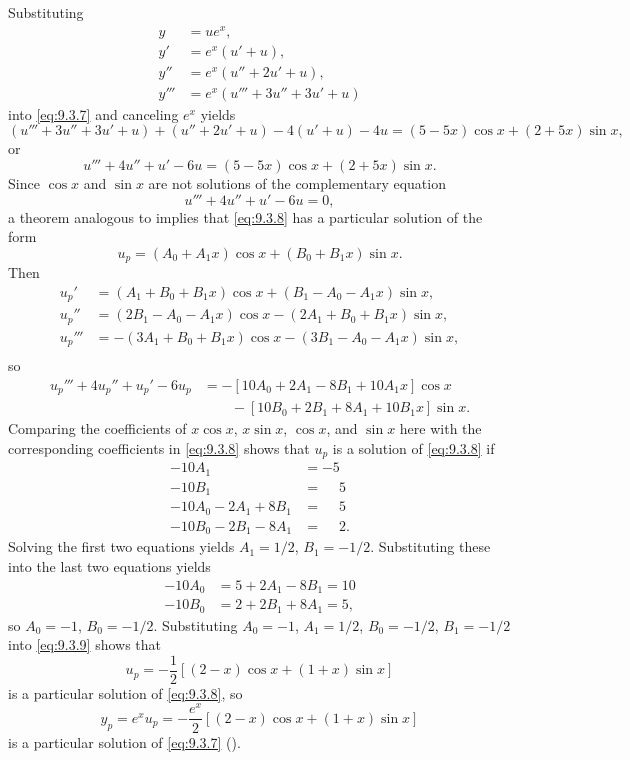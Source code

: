 \begin{solution}
Substituting
\begin{align*}
y&=ue^x,\\
y'&=e^x(u'+u),\\
y''&=e^x(u''+2u'+u),\\
y'''&=e^x(u'''+3u''+3u'+u)
\end{align*}
into \eqref{eq:9.3.7} and canceling $e^x$ yields
\[
(u'''+3u''+3u'+u)+(u''+2u'+u)-4(u'+u)-4u
=(5-5x)\cos x+(2+5x)\sin x,
\]
or
\begin{equation} \label{eq:9.3.8}
u'''+4u''+u'-6u=(5-5x)\cos x+(2+5x)\sin x.
\end{equation}
Since $\cos x$ and $\sin x$ are not solutions of the complementary
equation
\[
u'''+4u''+u'-6u=0,
\]
a theorem analogous to  implies that
\eqref{eq:9.3.8} has a particular solution of the form
\begin{equation} \label{eq:9.3.9}
u_p=(A_0+A_1x)\cos x+(B_0+B_1x)\sin x.
\end{equation}
Then
\begin{align*}
u_p'&=(A_1+B_0+B_1x)\cos x+(B_1-A_0-A_1x)\sin x,\\
u_p''&=(2B_1-A_0-A_1x)\cos x-(2A_1+B_0+B_1x)\sin x,\\
u_p'''&=-(3A_1+B_0+B_1x)\cos x-(3B_1-A_0-A_1x)\sin x,\\
\end{align*}
so
\begin{align*}
u_p'''+4u_p''+u_p'-6u_p
&=-\left[10A_0+2A_1-8B_1+10A_1x\right]\cos x\\
&\qquad{}- \left[10B_0+2B_1+8A_1+10B_1x\right]\sin x.
\end{align*}
Comparing the coefficients of $x\cos x$, $x\sin x$, $\cos x$, and
$\sin x$ here with the corresponding coefficients in \eqref{eq:9.3.8}
shows that $u_p$ is a solution of \eqref{eq:9.3.8} if
\begin{align*}
-10A_1&=-5\\
-10B_1&=\phantom{-}5\\
-10A_0-2A_1+8B_1&=\phantom{-}5\\
-10B_0-2B_1-8A_1&=\phantom{-}2.
\end{align*}
Solving the first two equations yields $A_1=1/2$, $B_1=-1/2$.
Substituting these into the last two equations  yields
\begin{align*}
-10A_0&=5+2A_1-8B_1=10\\
-10B_0&=2+2B_1+8A_1=5,
\end{align*}
so $A_0=-1$, $B_0=-1/2$.
Substituting $A_0=-1$, $A_1=1/2$, $B_0=-1/2$, $B_1=-1/2$ into
\eqref{eq:9.3.9} shows that
\[
u_p=-\frac{1}{2}\left[(2-x)\cos
x+(1+x)\sin x\right]
\]
is a particular solution of  \eqref{eq:9.3.8}, so
\[
y_p=e^xu_p=-\frac{e^x}{2}\left[(2-x)\cos x+(1+x)\sin x\right]
\]
is a particular  solution of \eqref{eq:9.3.7} ().
\end{solution}

